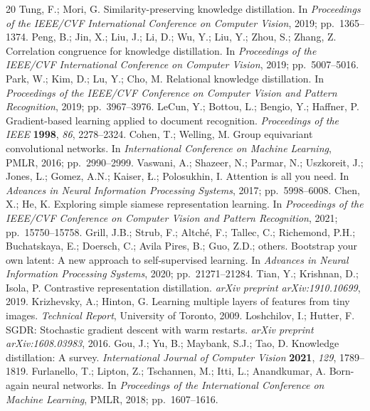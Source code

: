 \documentclass[symmetry,article,submit,pdftex,moreauthors]{Definitions/mdpi}
\begin{document}
\begin{thebibliography}{20}
 Tung, F.; Mori, G. Similarity-preserving knowledge distillation. In \textit{Proceedings of the IEEE/CVF International Conference on Computer Vision}, 2019; pp.~1365--1374.
 Peng, B.; Jin, X.; Liu, J.; Li, D.; Wu, Y.; Liu, Y.; Zhou, S.; Zhang, Z. Correlation congruence for knowledge distillation. In \textit{Proceedings of the IEEE/CVF International Conference on Computer Vision}, 2019; pp.~5007--5016.
 Park, W.; Kim, D.; Lu, Y.; Cho, M. Relational knowledge distillation. In \textit{Proceedings of the IEEE/CVF Conference on Computer Vision and Pattern Recognition}, 2019; pp.~3967--3976.
 LeCun, Y.; Bottou, L.; Bengio, Y.; Haffner, P. Gradient-based learning applied to document recognition. \textit{Proceedings of the IEEE} \textbf{1998}, \textit{86}, 2278--2324.
 Cohen, T.; Welling, M. Group equivariant convolutional networks. In \textit{International Conference on Machine Learning}, PMLR, 2016; pp.~2990--2999.
 Vaswani, A.; Shazeer, N.; Parmar, N.; Uszkoreit, J.; Jones, L.; Gomez, A.N.; Kaiser, \L.; Polosukhin, I. Attention is all you need. In \textit{Advances in Neural Information Processing Systems}, 2017; pp.~5998--6008.
 Chen, X.; He, K. Exploring simple siamese representation learning. In \textit{Proceedings of the IEEE/CVF Conference on Computer Vision and Pattern Recognition}, 2021; pp.~15750--15758.
 Grill, J.B.; Strub, F.; Altch\'{e}, F.; Tallec, C.; Richemond, P.H.; Buchatskaya, E.; Doersch, C.; Avila Pires, B.; Guo, Z.D.; others. Bootstrap your own latent: A new approach to self-supervised learning. In \textit{Advances in Neural Information Processing Systems}, 2020; pp.~21271--21284.
 Tian, Y.; Krishnan, D.; Isola, P. Contrastive representation distillation. \textit{arXiv preprint arXiv:1910.10699}, 2019.
 Krizhevsky, A.; Hinton, G. Learning multiple layers of features from tiny images. \textit{Technical Report}, University of Toronto, 2009.
 Loshchilov, I.; Hutter, F. SGDR: Stochastic gradient descent with warm restarts. \textit{arXiv preprint arXiv:1608.03983}, 2016.
 Gou, J.; Yu, B.; Maybank, S.J.; Tao, D. Knowledge distillation: A survey. \textit{International Journal of Computer Vision} \textbf{2021}, \textit{129}, 1789--1819.
 Furlanello, T.; Lipton, Z.; Tschannen, M.; Itti, L.; Anandkumar, A. Born-again neural networks. In \textit{Proceedings of the International Conference on Machine Learning}, PMLR, 2018; pp.~1607--1616.
\end{thebibliography}

\PublishersNote{}
\end{document}
